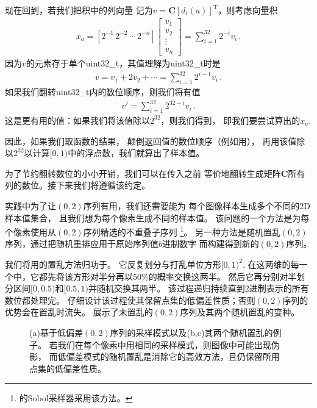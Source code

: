 现在回到，若我们把积中的列向量
记为$v={\bm C}[d_i(a)]^{\mathrm{T}}$，则考虑向量积
\begin{align}\label{eq:7.11}
    x_a=[2^{-1}\, 2^{-2}\,\cdots\, 2^{-n}]\left[
        \begin{array}{c}
            v_1    \\
            v_2    \\
            \vdots \\
            v_n
        \end{array}
        \right]=\sum\limits_{i=1}^{32}{2^{-i}v_i}\, .
\end{align}
因为$v$的元素存于单个{\ttfamily uint32\_t}，其值理解为{\ttfamily uint32\_t}时是
\begin{align*}
    v=v_1+2v_2+\cdots=\sum\limits_{i=1}^{32}{2^{i-1}v_i}\, .
\end{align*}
如果我们翻转{\ttfamily uint32\_t}内的数位顺序，则我们将有值
\begin{align*}
    v'=\sum\limits_{i=1}^{32}{2^{32-i}v_i}\, .
\end{align*}
这是更有用的值：如果我们将该值除以$2^{32}$，则我们得到，
即我们要尝试算出的$x_a$.

因此，如果我们取函数的结果，
颠倒返回值的数位顺序（例如用），
再用该值除以$2^{32}$以计算$[0,1)$中的浮点数，我们就算出了样本值。

为了节约翻转数位的小小开销，我们可以在传入之前
等价地翻转生成矩阵$\bm C$所有列的数位。接下来我们将遵循该约定。

实践中为了让$(0,2)$序列有用，我们还需要能为
每个图像样本生成多个不同的2D样本值集合，
且我们想为每个像素生成不同的样本值。
该问题的一个方法是为每个像素使用从$(0,2)$序列精选的不重叠子序列
\footnote{的Sobol采样器采用该方法。}。
另一种方法是随机置乱$(0,2)$序列，通过把随机重排应用于原始序列值$b$进制数字
而构建得到新的$(0,2)$序列。

我们将用的置乱方法归功于\citet{10.1111/1467-8659.00706}。
它反复划分与打乱单位方形$[0,1)^2$.
在这两维的每一个中，它都先将该方形对半分再以50\%的概率交换这两半。
然后它再分别对半划分区间$[0,0.5)$和$[0.5,1)$并随机交换其两半。
该过程递归持续直到2进制表示的所有数位都处理完。
仔细设计该过程使其保留点集的低偏差性质；否则$(0,2)$序列的优势会在置乱时流失。
展示了未置乱的$(0,2)$序列及其两个随机置乱的变种。
\begin{figure}[htbp]
    \centering
    \quad
    \quad
    \caption{(a)基于低偏差$(0,2)$序列的采样模式以及(b,c)其两个随机置乱的例子。
        若我们在每个像素中用相同的采样模式，则图像中可能出现伪影，
        而低偏差模式的随机置乱是消除它的高效方法，且仍保留所用点集的低偏差性质。}
    \label{fig:7.29}
\end{figure}

